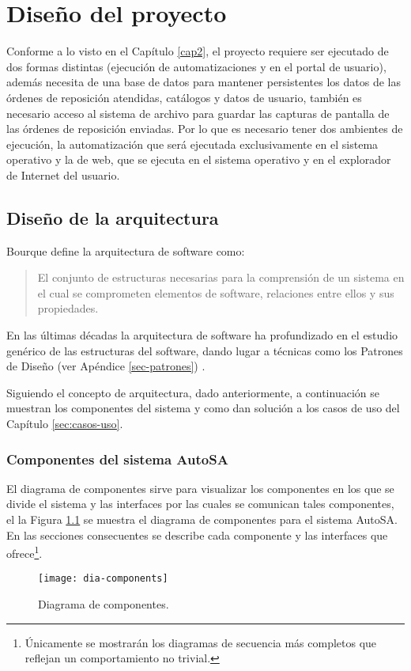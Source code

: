 \chapter{Diseño del proyecto}\label{cap3}
Conforme a lo visto en el Capítulo \ref{cap2}, el proyecto requiere ser ejecutado de dos formas distintas (ejecución de automatizaciones y en el portal de usuario), además necesita de una base de datos para mantener persistentes los datos de las órdenes de reposición atendidas, catálogos y datos de usuario, también es necesario acceso al sistema de archivo para guardar las capturas de pantalla de las órdenes de reposición enviadas. Por lo que es necesario tener dos ambientes de ejecución, la automatización que será ejecutada exclusivamente en el sistema operativo y la de web, que se ejecuta en el sistema operativo y en el explorador de Internet del usuario.




\section{Diseño de la arquitectura}
Bourque define la arquitectura de software como:
\begin{quote}
	El conjunto de estructuras necesarias para la comprensión de un sistema en el cual se comprometen elementos de software, relaciones entre ellos y sus propiedades\cite{SWEBOOK}.
\end{quote}
En las últimas décadas la arquitectura de software ha profundizado en el estudio genérico de las estructuras del software, dando lugar a técnicas como los Patrones de Diseño (ver Apéndice \ref{sec-patrones}) \cite{SWEBOOK, SoftwareArchitectureInAction}.

Siguiendo el concepto de arquitectura, dado anteriormente, a continuación se muestran los componentes del sistema y como dan solución a los casos de uso del Capítulo \ref{sec:casos-uso}.

\subsection{Componentes del sistema AutoSA}
El diagrama de componentes sirve para visualizar los componentes en los que se divide el sistema y las interfaces por las cuales se comunican tales componentes, el la Figura \ref{fig:dia-components} se muestra el diagrama de componentes para el sistema AutoSA. En las secciones consecuentes se describe cada componente y las interfaces que ofrece\footnote{Únicamente se mostrarán los diagramas de secuencia más completos que reflejan un comportamiento no trivial.}.
\begin{figure}[h]
\centering
\texttt{[image: dia-components]}
\caption{Diagrama de componentes.}
\label{fig:dia-components}
\end{figure}

